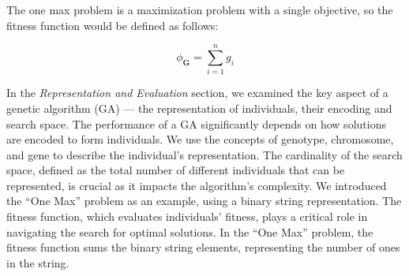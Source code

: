   The one max problem is a maximization problem with a single objective, so the fitness function
  would be defined as follows:

  \begin{equation}
    \label{eq:fitness_function:one_max}
    \phi_\mathbf{G} = \sum_{i=1}^n g_i
  \end{equation}

  In the \emph{Representation and Evaluation} section, we examined the key aspect of a genetic 
  algorithm (GA) — the representation of individuals, their encoding and search space.
  The performance of a GA significantly depends on how solutions are encoded to form individuals.
  We use the concepts of genotype, chromosome, and gene to describe the individual's representation.
  The cardinality of the search space, defined as the total number of different individuals that can
  be represented, is crucial as it impacts the algorithm's complexity.
  We introduced the \enquote{One Max} problem as an example, using a binary string representation.
  The fitness function, which evaluates individuals' fitness, plays a critical role in navigating 
  the search for optimal solutions.
  In the \enquote{One Max} problem, the fitness function sums the binary string elements, 
  representing the number of ones in the string.
